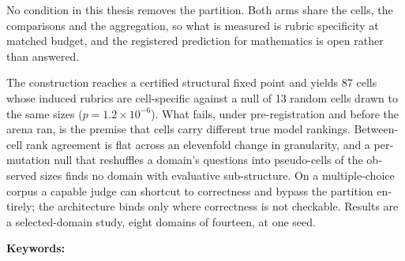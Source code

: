 \begin{otherlanguage}{english}
No condition in this thesis removes the partition. Both arms share the
cells, the comparisons and the aggregation, so what is measured is
rubric specificity at matched budget, and the registered prediction for
mathematics is open rather than answered.

The construction reaches a certified structural fixed point and yields
87 cells whose induced rubrics are cell-specific against a null of 13
random cells drawn to the same sizes ($p = 1.2 \times 10^{-6}$). What
fails, under pre-registration and before the arena ran, is the premise
that cells carry different true model rankings. Between-cell rank
agreement is flat across an elevenfold change in granularity, and a
permutation null that reshuffles a domain's questions into pseudo-cells
of the observed sizes finds no domain with evaluative sub-structure. On
a multiple-choice corpus a capable judge can shortcut to correctness
and bypass the partition entirely; the architecture binds only where
correctness is not checkable. Results are a selected-domain study,
eight domains of fourteen, at one seed.
\par\medskip
\noindent\textbf{Keywords:} \itshape \englishkeywords
\end{otherlanguage}